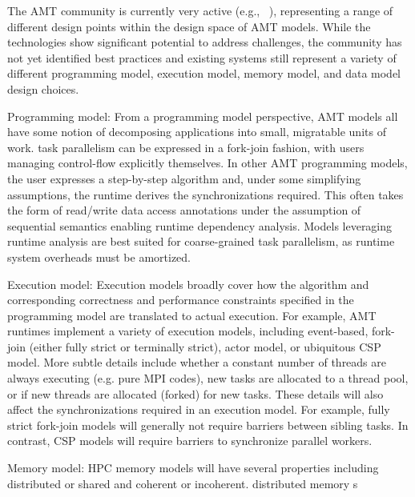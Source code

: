 The \gls{AMT} community is currently very active (e.g.,
~\cite{OCR,STAPL,Legion,Realm,StencilHPX,Charm++,Uintah,Loci,PARSEC,DaGuE,Cilk}),
representing a range of different design points within the
design space of \gls{AMT} models. While the technologies show significant
potential to address challenges, the community has not yet identified best
practices and existing systems still represent a variety of different \gls{programming model},
\gls{execution model}, \gls{memory model}, and \gls{data model} design choices.  

\begin{compactdesc}
\item[Programming model:]
From a \gls{programming model} perspective, \gls{AMT} models all have some notion of decomposing applications into small, \gls{migratable} units of work. 
\Gls{task parallelism} can be expressed in a \gls{fork-join} fashion, with users managing control-flow explicitly themselves. 
  In other \gls{AMT} \glspl{programming model}, the user expresses a step-by-step algorithm and, under some simplifying assumptions, the runtime derives the synchronizations required.
  This often takes the form of read/write data access annotations under the assumption of sequential semantics enabling runtime dependency analysis.
  Models leveraging runtime analysis are best suited for coarse-grained \gls{task parallelism}, as \gls{runtime system} overheads must be amortized.
\item[Execution model:]
  Execution models broadly cover how the algorithm and corresponding correctness and performance constraints specified in the programming model are translated to actual execution.
  For example, \gls{AMT} runtimes implement a variety of \glspl{execution model}, including \gls{event-based}, \gls{fork-join} (either \gls{fully strict} or \gls{terminally strict}), \gls{actor model}, or ubiquitous CSP model.  More subtle details include whether a constant number of threads are always executing (e.g. pure MPI codes), new tasks are allocated to a thread pool, or if new threads are allocated (forked) for new tasks. These details will also affect the synchronizations required in an execution model. For example, fully strict fork-join models will generally not require barriers between sibling tasks. In contrast, CSP models will require barriers to synchronize parallel workers.
\item[Memory model:]
  \gls{HPC} \glspl{memory model} will have several properties including distributed or shared and coherent or incoherent. 
  \glspl{distributed memory
}
\end{compactdesc}
